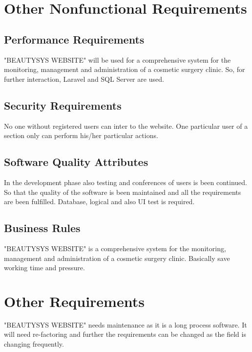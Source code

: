 \documentclass{scrreprt}
\begin{document}
\chapter{Other Nonfunctional Requirements}

\section{Performance Requirements}
"BEAUTYSYS WEBSITE" will be used for a comprehensive system for the monitoring, management and administration of a cosmetic surgery clinic. So, for further interaction, Laravel and SQL Server are used.

\section{Security Requirements}
No one without registered users can inter to the website. One particular user of a section only can perform his/her particular actions. 

\section{Software Quality Attributes}
In the development phase also testing and conferences of users is been continued. So that the quality of the software is been maintained and all the requirements are been fulfilled.
\newline
Database, logical and also UI test is required. 

\section{Business Rules}
"BEAUTYSYS WEBSITE" is a comprehensive system for the monitoring, management and administration of a cosmetic surgery clinic.
\newline
Basically save working time and pressure. 


\chapter{Other Requirements}
"BEAUTYSYS WEBSITE" needs maintenance as it is a long process software. It will need re-factoring and further the requirements can be changed as the field is changing frequently. 
\end{document}
